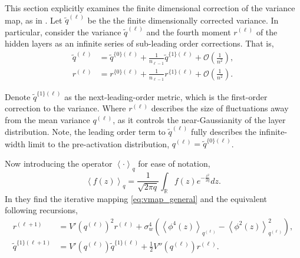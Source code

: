 \documentclass{article}
\theoremstyle{plain}
\theoremstyle{definition}
\theoremstyle{remark}
\begin{document}
This section explicitly examines the finite dimensional correction of the variance map, as in \cite{roberts_principles_2022}. Let $\tilde{q}^{(\ell)}$ be the the finite dimensionally corrected variance.
In particular, consider the variance $\tilde{q}^{(\ell)}$ and the fourth moment $r^{(\ell)}$ of the hidden layers as an infinite series of sub-leading order corrections. That is,
\begin{align}
    \tilde{q}^{(\ell)} &= \tilde{q}^{\{0\}(\ell)} + \frac{1}{n_{\ell-1}}\tilde{q}^{\{1\}(\ell)} + \mathcal{O}\left( \frac{1}{n^{2}}\right), \\
    r^{(\ell)} &= r^{\{0\}(\ell)} + \frac{1}{n_{\ell-1}}r^{\{1\}(\ell)} + \mathcal{O}\left( \frac{1}{n^{2}}\right).
\end{align}


Denote $\tilde{q}^{\{1\}(\ell)}$ as the next-leading-order metric, which is the first-order correction to the variance. Where $r^{(\ell)}$ describes the size of fluctuations away from the mean variance $q^{(\ell)}$, as it controls the near-Gaussianity of the layer distribution. Note, the leading order term to $\tilde{q}^{(\ell)}$ fully describes the infinite-width limit to the pre-activation distribution, $q^{(\ell)} = \tilde{q}^{\{0\}(\ell)}$.

Now introducing the operator $\left\langle \cdot \right\rangle_{q}$ for ease of notation,
\begin{equation}
    \left\langle f(z) \right\rangle_{q} = \frac{1}{\sqrt{2\pi q}}\int_{\mathbb{R}} f(z)e^{-\frac{z^2}{2q}}dz.
\end{equation}
In \cite{roberts_principles_2022} they find the iterative mapping \eqref{eq:vmap_general} and the equivalent following recursions,
\begin{align}
    r^{(\ell+1)} &= V' \left( q^{(\ell)}\right)^2r^{(\ell)}+ \sigma_w^4 \left( \left\langle \phi^4(z) \right\rangle_{q^{(\ell)}} - \left\langle \phi^2(z) \right\rangle^2_{q^{(\ell)}}\right), \label{eq:fourth_mom_recursion}\\
    \tilde{q}^{\{1\}(\ell+1)} &=  V' \left( q^{(\ell)}\right) \tilde{q}^{\{1\}(\ell)} + \frac{1}{2} V''\left( q^{(\ell)}\right) r^{(\ell)} \label{eq:nlo_recursion}.
\end{align}
\end{document}
